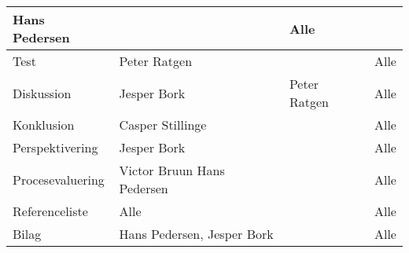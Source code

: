 \begin{table}[h!]
\begin{tabular}{|p{45mm}|p{30mm}|p{26mm}|p{26mm}|}
                                 Hans Pedersen    &          & Alle \\ \hline
        Test                   & Peter Ratgen     &          & Alle \\ \hline
        Diskussion             & Jesper Bork      &    Peter Ratgen      & Alle \\ \hline
        Konklusion             & Casper Stillinge &          & Alle \\ \hline
        Perspektivering        & Jesper Bork      &          & Alle \\ \hline
        Procesevaluering       & Victor Bruun \newline
                                 Hans Pedersen    &          & Alle \\ \hline
        Referenceliste         & Alle             &          & Alle \\ \hline
        Bilag                  & Hans Pedersen, Jesper Bork  &          & Alle \\ \hline
    \end{tabular}
\end{table}

\clearpage
